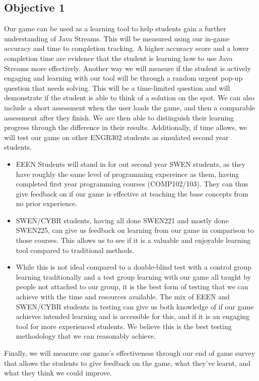 \documentclass{article}
\begin{document}
\subsection*{Objective 1}
Our game can be used as a learning tool to help students gain a further understanding of Java Streams. This will be measured using our in-game accuracy and time to completion tracking. A higher accuracy score and a lower completion time are evidence that the student is learning how to use Java Streams more effectively.
\newline\newline
Another way we will measure if the student is actively engaging and learning with our tool will be through a random urgent pop-up question that needs solving. This will be a time-limited question and will demonstrate if the student is able to think of a solution on the spot.
\newline\newline
We can also include a short assessment when the user loads the game, and then a comparable assessment after they finish. We are then able to distinguish their learning progress through the difference in their results.
\newline\newline
Additionally, if time allows, we will test our game on other ENGR302 students as simulated second year students.
\begin{itemize}
    \item EEEN Students will stand in for out second year SWEN students, as they have roughly the same level of programming expereince as them, having completed first year programming courses (COMP102/103). They can thus give feedback on if our game is effective at teaching the base concepts from no prior experience.
    \item SWEN/CYBR students, having all done SWEN221 and mostly done SWEN225, can give us feedback on learning from our game in comparison to those courses. This allows us to see if it is a valuable and enjoyable learning tool compared to traditional methods.
    \item While this is not ideal compared to a double-blind test with a control group learning traditionally and a test group learning with our game all taught by people not attached to our group, it is the best form of testing that we can achieve with the time and resources available. The mix of EEEN and SWEN/CYBR students in testing can give us both knowledge of if our game achieves intended learning and is accessible for this, and if it is an engaging tool for more experienced students. We believe this is the best testing methodology that we can reasonably achieve.
\end{itemize}
Finally, we will measure our game’s effectiveness through our end of game survey that allows the students to give feedback on the game, what they’ve learnt, and what they think we could improve.
\end{document}
